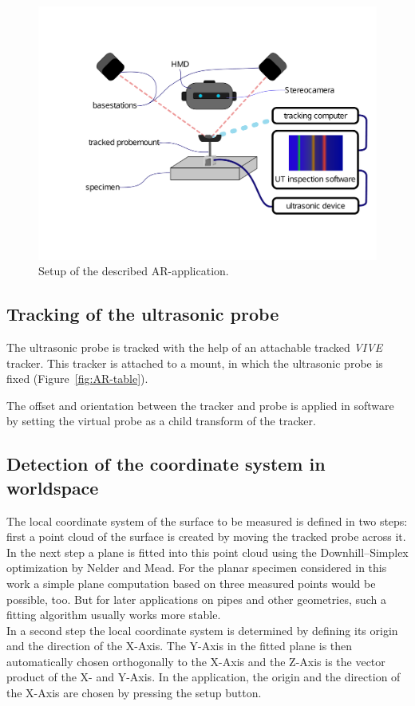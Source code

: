 \documentclass{VRARWorkshop}
\begin{document}
\begin{figure}[h!]
    \begin{center}
        \includegraphics[width=158mm]{images/Setup-ARUS}
        \caption{\label{fig:Setup} Setup of the described AR-application.}
    \end{center}
\end{figure}

\subsection{Tracking of the ultrasonic probe}
The ultrasonic probe is tracked with the help of an attachable tracked \textit{VIVE} tracker.
This tracker is attached to a mount, in which the ultrasonic probe is fixed (Figure~\ref{fig:AR-table}).

The offset and orientation between the tracker and probe is applied in software by setting the virtual probe as a child transform of the tracker.

\subsection{Detection of the coordinate system in worldspace}
The local coordinate system of the surface to be measured is defined in two steps:
first a point cloud of the surface is created by moving the tracked probe across it.
In the next step a plane is fitted into this point cloud using the Downhill--Simplex optimization by Nelder and Mead. For the planar specimen considered in this work a simple plane computation based on three measured points
would be possible, too. But for later applications on pipes and other geometries, such a fitting algorithm usually works more stable. \\
In a second step the local coordinate system is determined by defining its origin and the direction of the X-Axis.
The Y-Axis in the fitted plane is then automatically chosen orthogonally to the X-Axis and the Z-Axis is the vector product of the X- and Y-Axis.
In the application, the origin and the direction of the X-Axis are chosen by pressing the setup button.
\end{document}
